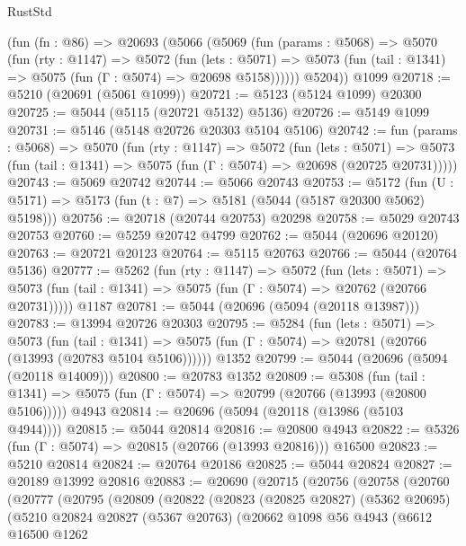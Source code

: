 \begin{lexlean}{RustStd}
\begin{coremodule}
    (fun (fn : @86) =>
    @20693
      (@5066
        (@5069
          (fun (params : @5068) =>
          @5070
            (fun (rty : @1147) =>
            @5072
              (fun (lets : @5071) =>
              @5073 (fun (tail : @1341) => @5075 (fun (Γ : @5074) => @20698 @5158))))))
        @5204))
    @1099
@20718 := @5210 (@20691 (@5061 @1099))
@20721 := @5123 (@5124 @1099) @20300
@20725 := @5044 (@5115 (@20721 @5132) @5136)
@20726 := @5149 @1099
@20731 := @5146 (@5148 @20726 @20303 @5104 @5106)
@20742 := fun (params : @5068) =>
  @5070
    (fun (rty : @1147) =>
    @5072
      (fun (lets : @5071) =>
      @5073 (fun (tail : @1341) => @5075 (fun (Γ : @5074) => @20698 (@20725 @20731)))))
@20743 := @5069 @20742
@20744 := @5066 @20743
@20753 := @5172
    (fun (U : @5171) => @5173 (fun (t : @7) => @5181 (@5044 (@5187 @20300 @5062) @5198)))
@20756 := @20718 (@20744 @20753) @20298
@20758 := @5029 @20743 @20753
@20760 := @5259 @20742 @4799
@20762 := @5044 (@20696 @20120)
@20763 := @20721 @20123
@20764 := @5115 @20763
@20766 := @5044 (@20764 @5136)
@20777 := @5262
    (fun (rty : @1147) =>
    @5072
      (fun (lets : @5071) =>
      @5073 (fun (tail : @1341) => @5075 (fun (Γ : @5074) => @20762 (@20766 @20731)))))
    @1187
@20781 := @5044 (@20696 (@5094 (@20118 @13987)))
@20783 := @13994 @20726 @20303
@20795 := @5284
    (fun (lets : @5071) =>
    @5073
      (fun (tail : @1341) =>
      @5075 (fun (Γ : @5074) => @20781 (@20766 (@13993 (@20783 @5104 @5106))))))
    @1352
@20799 := @5044 (@20696 (@5094 (@20118 @14009)))
@20800 := @20783 @1352
@20809 := @5308
    (fun (tail : @1341) => @5075 (fun (Γ : @5074) => @20799 (@20766 (@13993 (@20800 @5106)))))
    @4943
@20814 := @20696 (@5094 (@20118 (@13986 (@5103 @4944))))
@20815 := @5044 @20814
@20816 := @20800 @4943
@20822 := @5326 (fun (Γ : @5074) => @20815 (@20766 (@13993 @20816))) @16500
@20823 := @5210 @20814
@20824 := @20764 @20186
@20825 := @5044 @20824
@20827 := @20189 @13992 @20816
@20883 := @20690
    (@20715
      (@20756
        (@20758
          (@20760
            (@20777
              (@20795
                (@20809
                  (@20822
                    (@20823
                      (@20825 @20827)
                      (@5362 @20695)
                      (@5210
                        @20824
                        @20827
                        (@5367 @20763)
                        (@20662
                          @1098
                          @56
                          @4943
                          (@6612
                            @16500
                            @1262

\end{coremodule}
\end{lexlean}
